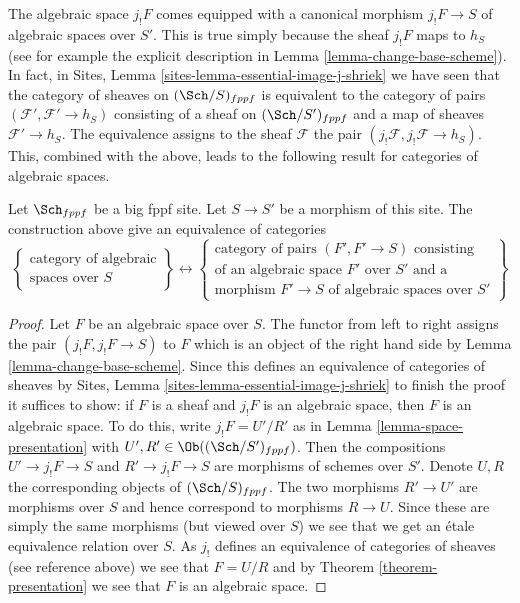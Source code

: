 \noindent
The algebraic space $j_!F$ comes equipped with a canonical morphism
$j_!F \to S$ of algebraic spaces over $S'$. This is true simply
because the sheaf $j_!F$ maps to $h_S$ (see for example the
explicit description in
Lemma \ref{lemma-change-base-scheme}).
In fact, in
Sites, Lemma \ref{sites-lemma-essential-image-j-shriek}
we have seen that the category of sheaves on $(\Sch/S)_{fppf}$
is equivalent to the category of pairs $(\mathcal{F}', \mathcal{F}' \to h_S)$
consisting of a sheaf on $(\Sch/S')_{fppf}$ and a map of sheaves
$\mathcal{F}' \to h_S$. The equivalence assigns to the sheaf $\mathcal{F}$
the pair $(j_!\mathcal{F}, j_!\mathcal{F} \to h_S)$.
This, combined with the above, leads to the following
result for categories of algebraic spaces.

\begin{lemma}
\label{lemma-category-of-spaces-over-smaller-base-scheme}
Let $\Sch_{fppf}$ be a big fppf site.
Let $S \to S'$ be a morphism of this site.
The construction above give an equivalence of
categories
$$
\left\{
\begin{matrix}
\text{category of algebraic}\\
\text{spaces over }S
\end{matrix}
\right\}
\leftrightarrow
\left\{
\begin{matrix}
\text{category of pairs }(F', F' \to S)\text{ consisting}\\
\text{of an algebraic space }F'\text{ over }S'\text{ and a}\\
\text{morphism }F' \to S\text{ of algebraic spaces over }S'
\end{matrix}
\right\}
$$
\end{lemma}

\begin{proof}
Let $F$ be an algebraic space over $S$. The functor from left to right
assigns the pair $(j_!F, j_!F \to S)$ to $F$
which is an object of the right hand side by
Lemma \ref{lemma-change-base-scheme}.
Since this defines an equivalence of categories of sheaves by
Sites, Lemma \ref{sites-lemma-essential-image-j-shriek}
to finish the proof it suffices to show:
if $F$ is a sheaf and $j_!F$ is an algebraic space, then $F$
is an algebraic space. To do this, write
$j_!F = U'/R'$ as in
Lemma \ref{lemma-space-presentation}
with $U', R' \in \Ob((\Sch/S')_{fppf})$.
Then the compositions $U' \to j_!F \to S$ and $R' \to j_!F \to S$
are morphisms of schemes over $S'$. Denote $U, R$ the corresponding
objects of $(\Sch/S)_{fppf}$. The two morphisms
$R' \to U'$ are morphisms over $S$ and hence correspond to
morphisms $R \to U$. Since these are simply the same
morphisms (but viewed over $S$) we see that we get an \'etale
equivalence relation over $S$. As $j_!$ defines an equivalence of
categories of sheaves (see reference above) we see that
$F = U/R$ and by
Theorem \ref{theorem-presentation}
we see that $F$ is an algebraic space.
\end{proof}


